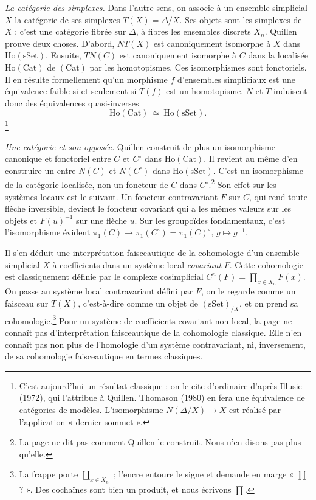 \documentclass[11pt,a4paper]{article}
\begin{document}
\emph{La catégorie des simplexes.} Dans l'autre sens, on associe à un ensemble
simplicial $X$ la catégorie de ses simplexes $T(X) = \Delta/X$. Ses objets sont
les simplexes de $X$ ; c'est une catégorie fibrée sur $\Delta$, à fibres les
ensembles discrets $X_n$. Quillen prouve deux choses. D'abord, $N T(X)$ est
canoniquement isomorphe à $X$ dans $\mathrm{Ho}(\mathrm{sSet})$. Ensuite,
$T N(C)$ est canoniquement isomorphe à $C$ dans la localisée
$\mathrm{Ho}(\mathrm{Cat})$ de $(\mathrm{Cat})$ par les homotopismes. Ces
isomorphismes sont fonctoriels. Il en résulte formellement qu'un morphisme
$f$ d'ensembles simpliciaux est une équivalence faible si et seulement si
$T(f)$ est un homotopisme. $N$ et $T$ induisent donc des équivalences
quasi-inverses
\[
\mathrm{Ho}(\mathrm{Cat}) \ \simeq\ \mathrm{Ho}(\mathrm{sSet}).
\]
\footnote{C'est aujourd'hui un résultat classique : on le cite d'ordinaire
d'après Illusie (1972), qui l'attribue à Quillen. Thomason (1980) en fera une
équivalence de catégories de modèles. L'isomorphisme $N(\Delta/X) \to X$ est
réalisé par l'application « dernier sommet ».}

\emph{Une catégorie et son opposée.} Quillen construit de plus un isomorphisme
canonique et fonctoriel entre $C$ et $C^{\circ}$ dans
$\mathrm{Ho}(\mathrm{Cat})$. Il revient au même d'en construire un entre
$N(C)$ et $N(C^{\circ})$ dans $\mathrm{Ho}(\mathrm{sSet})$. C'est un
isomorphisme de la catégorie localisée, non un foncteur de $C$ dans
$C^{\circ}$.\footnote{La page ne dit pas comment Quillen le construit. Nous
n'en disons pas plus qu'elle.} Son effet sur les systèmes locaux est le suivant.
Un foncteur contravariant $F$ sur $C$, qui rend toute flèche inversible, devient
le foncteur covariant qui a les mêmes valeurs sur les objets et $F(u)^{-1}$ sur
une flèche $u$. Sur les groupoïdes fondamentaux, c'est l'isomorphisme évident
$\pi_1(C) \to \pi_1(C^{\circ}) = \pi_1(C)^{\circ}$, $g \mapsto g^{-1}$.

Il s'en déduit une interprétation faisceautique de la cohomologie d'un ensemble
simplicial $X$ à coefficients dans un système local \emph{covariant} $F$. Cette
cohomologie est classiquement définie par le complexe cosimplicial
$C^{n}(F) = \prod_{x \in X_n} F(x)$. On passe au système local contravariant
défini par $F$, on le regarde comme un faisceau sur $T(X)$, c'est-à-dire comme
un objet de $(\mathrm{sSet})_{/X}$, et on prend sa cohomologie.\footnote{La
frappe porte $\coprod_{x \in X_n}$ ; l'encre entoure le signe et demande en
marge « $\prod$ ? ». Des cochaînes sont bien un produit, et nous écrivons
$\prod$.} Pour un système de coefficients covariant non local, la page ne
connaît pas d'interprétation faisceautique de la cohomologie classique. Elle
n'en connaît pas non plus de l'homologie d'un système contravariant, ni,
inversement, de sa cohomologie faisceautique en termes classiques.
\end{document}

